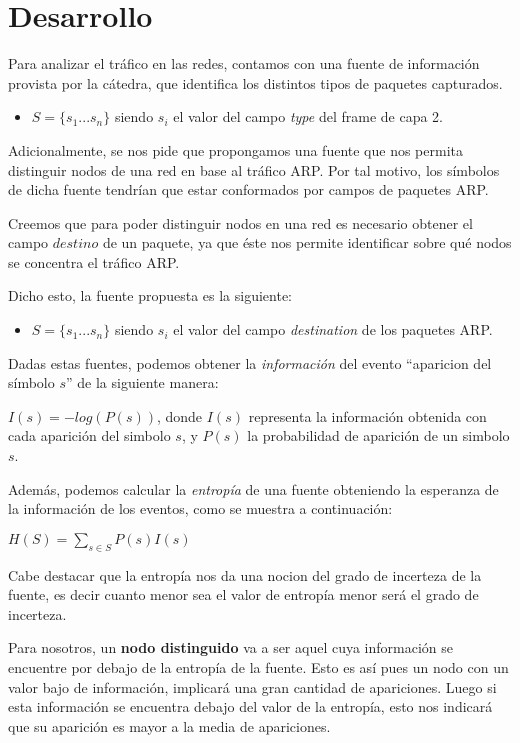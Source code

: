 \section{Desarrollo}

Para analizar el tráfico en las redes, contamos con una fuente de información provista por la cátedra, que identifica los distintos tipos de paquetes capturados.

\begin{itemize}
\item $S=\{s_1 ... s_n\}$ siendo $s_i$ el valor del campo \textit{type} del frame de capa 2.
\end{itemize}

Adicionalmente, se nos pide que propongamos una fuente que nos permita distinguir nodos de una red en base al tráfico ARP. Por tal motivo, los símbolos de dicha fuente tendrían que estar conformados por campos de paquetes ARP.

Creemos que para poder distinguir nodos en una red es necesario obtener el campo $destino$ de un paquete, ya que éste nos permite identificar sobre qué nodos se concentra el tráfico ARP.

Dicho esto, la fuente propuesta es la siguiente:

\begin{itemize}
\item $S=\{s_1 ... s_n\}$ siendo $s_i$ el valor del campo \textit{destination} de los paquetes ARP.
\end{itemize}


Dadas estas fuentes, podemos obtener la \textit{información} del evento ``aparicion del símbolo $s$'' de la siguiente manera:

$I(s) = -log(P(s))$, donde $I(s)$ representa la información obtenida con cada aparición del simbolo $s$, y $P(s)$ la probabilidad de aparición de un simbolo $s$.

Además, podemos calcular la \textit{entropía} de una fuente obteniendo la esperanza de la información de los eventos, como se muestra a continuación:

$H(S) = \sum_{s \in S} P(s) I(s)$

Cabe destacar que la entropía nos da una nocion del grado de incerteza de la fuente, es decir cuanto menor sea el valor de entropía menor será el grado de incerteza. 

Para nosotros, un \textbf{nodo distinguido} va a ser aquel cuya información se encuentre por debajo de la entropía de la fuente. Esto es así pues un nodo con un valor bajo de información, implicará una gran cantidad de apariciones. Luego si esta información se encuentra debajo del valor de la entropía, esto nos indicará que su aparición es mayor a la media de apariciones.  


